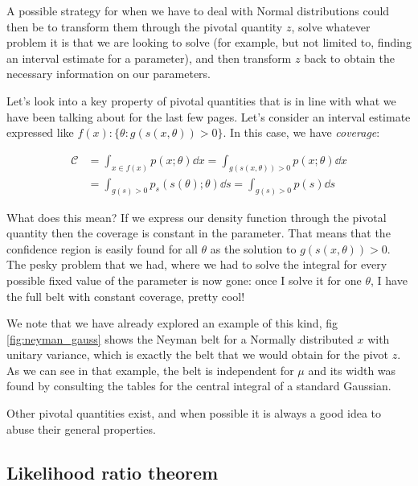A possible strategy for when we have to deal with Normal distributions could then be to transform them through the pivotal quantity $z$, solve whatever problem it is that we are looking to solve (for example, but not limited to, finding an interval estimate for a parameter), and then transform $z$ back to obtain the necessary information on our parameters. 

Let's look into a key property of pivotal quantities that is in line with what we have been talking about for the last few pages. Let's consider an interval estimate expressed like $f(x): \{\theta: g\left(s(x,\theta)\right)>0\}$. In this case, we have \emph{coverage}:
	
	\begin{align*}
		\mathcal{C} &= \int_{x\in f(x)} p(x;\theta)\dd x = \int_{g\left(s(x,\theta)\right)>0} p(x;\theta)\dd x \\
		&= \int_{g(s)>0} p_s\left(s(\theta);\theta\right)\dd s = \int_{g(s)> 0} p(s) \dd s
	\end{align*}

What does this mean? If we express our density function through the pivotal quantity then the coverage is constant in the parameter. That means that the confidence region is easily found for all $\theta$ as the solution to $g\left(s(x,\theta)\right)>0$. The pesky problem that we had, where we had to solve the integral for every possible fixed value of the parameter is now gone: once I solve it for one $\theta$, I have the full belt with constant coverage, pretty cool! 

We note that we have already explored an example of this kind, fig \ref{fig:neyman_gauss} shows the Neyman belt for a Normally distributed $x$ with unitary variance, which is exactly the belt that we would obtain for the pivot $z$. As we can see in that example, the belt is independent for $\mu$ and its width was found by consulting the tables for the central integral of a standard Gaussian.

Other pivotal quantities exist, and when possible it is always a good idea to abuse their general properties.


\subsection{Likelihood ratio theorem}

